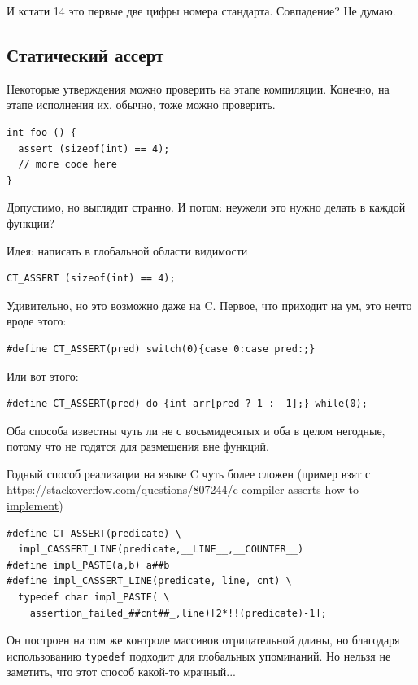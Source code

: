 \documentclass[a4paper,12pt,oneside]{book}
\begin{document}
И кстати 14 это первые две цифры номера стандарта. Совпадение? Не думаю.

\subsection{Статический ассерт}

Некоторые утверждения можно проверить на этапе компиляции. Конечно, на этапе исполнения их, обычно, тоже можно проверить.

\begin{lstlisting}
int foo () {
  assert (sizeof(int) == 4);
  // more code here
}
\end{lstlisting}

Допустимо, но выглядит странно. И потом: неужели это нужно делать в каждой функции?

Идея: написать в глобальной области видимости

\begin{lstlisting}
CT_ASSERT (sizeof(int) == 4);
\end{lstlisting}

Удивительно, но это возможно даже на C. Первое, что приходит на ум, это нечто вроде этого:

\begin{lstlisting}
#define CT_ASSERT(pred) switch(0){case 0:case pred:;}
\end{lstlisting}

Или вот этого:

\begin{lstlisting}
#define CT_ASSERT(pred) do {int arr[pred ? 1 : -1];} while(0);
\end{lstlisting}

Оба способа известны чуть ли не с восьмидесятых и оба в целом негодные, потому что не годятся для размещения вне функций.

Годный способ реализации на языке C чуть более сложен (пример взят с  \url{https://stackoverflow.com/questions/807244/c-compiler-asserts-how-to-implement})

\begin{lstlisting}
#define CT_ASSERT(predicate) \
  impl_CASSERT_LINE(predicate,__LINE__,__COUNTER__)
#define impl_PASTE(a,b) a##b
#define impl_CASSERT_LINE(predicate, line, cnt) \
  typedef char impl_PASTE( \
    assertion_failed_##cnt##_,line)[2*!!(predicate)-1];
\end{lstlisting}

Он построен на том же контроле массивов отрицательной длины, но благодаря использованию \lstinline!typedef! подходит для глобальных упоминаний. Но нельзя не заметить, что этот способ какой-то мрачный...
\end{document}
